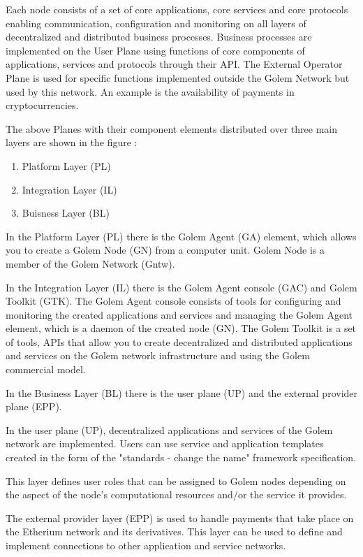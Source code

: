 Each node consists of a set of core applications, core services
and core protocols enabling communication, configuration and monitoring 
on all layers of decentralized and distributed business processes.
Business processes are implemented on the User Plane using functions of 
core components of applications, services and protocols through their API.
The External Operator Plane is used for specific functions implemented
outside the Golem Network but used by this network. An example is the availability of
payments in cryptocurrencies.

The above Planes with their component elements distributed over three main layers 
are shown in the figure :

\begin{enumerate}
	\item Platform Layer (PL)
	\item Integration Layer (IL)
	\item Buisness Layer (BL)
\end{enumerate}

In the Platform Layer (PL) there is the Golem Agent (GA) element,
which allows you to create a Golem Node (GN) from a computer unit.
Golem Node is a member of the Golem Network (Gntw).

In the Integration Layer (IL) there is the Golem Agent console (GAC) and Golem Toolkit (GTK).
The Golem Agent console consists of tools for configuring and monitoring the created applications and services
and managing the Golem Agent element, which is a daemon of the created node (GN).
The Golem Toolkit is a set of tools, APIs that allow you to create decentralized and distributed applications and services
on the Golem network infrastructure and using the Golem commercial model.

In the Business Layer (BL) there is the user plane (UP) and the external provider plane (EPP).

In the user plane (UP), decentralized applications and services of the Golem network are implemented.
Users can use service and application templates created in the form of the "standards - change the name" framework specification.

This layer defines user roles that can be assigned to Golem nodes depending on the aspect of the node's computational resources and/or the service it provides.

The external provider layer (EPP) is used to handle payments that take place on the Etherium network and its derivatives.
This layer can be used to define and implement connections to other application and service networks.


